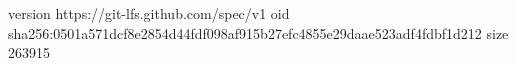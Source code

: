 version https://git-lfs.github.com/spec/v1
oid sha256:0501a571dcf8e2854d44fdf098af915b27efc4855e29daae523adf4fdbf1d212
size 263915
